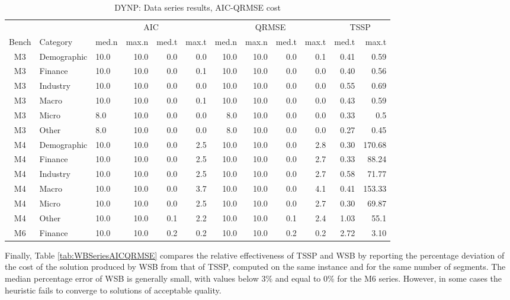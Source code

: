 \documentclass[preprints,article,submit,pdftex,moreauthors]{Definitions/mdpi}
\begin{document}
\begin{table}[ht]
	\centering
	\caption{DYNP: Data series results, AIC-QRMSE cost}\label{tab:DYNPseriesAICQRMSE}%
	\begin{tabular}{@{}cl|lr|rr|rr|rr|rr}
		\toprule
		& & \multicolumn{4}{c|}{AIC} & \multicolumn{4}{c}{QRMSE} & \multicolumn{2}{|c}{TSSP} \\
		Bench & Category & med.n & max.n & med.t & max.t & med.n & max.n & med.t & max.t & med.t & max.t \\
		\midrule
		M3 & Demographic  & 10.0 & 10.0 & 0.0 & 0.0 & 10.0 & 10.0 & 0.0 & 0.1 & 0.41 & 0.59\\
		M3 & Finance     & 10.0 & 10.0 & 0.0 & 0.1 & 10.0 & 10.0 & 0.0 & 0.0 & 0.40 & 0.56\\
		M3 & Industry     & 10.0 & 10.0 & 0.0 & 0.0 & 10.0 & 10.0 & 0.0 & 0.0 & 0.55 & 0.69\\
		M3 & Macro        & 10.0 & 10.0 & 0.0 & 0.1 & 10.0 & 10.0 & 0.0 & 0.0 & 0.43 & 0.59\\
		M3 & Micro        & 8.0 & 10.0 & 0.0 & 0.0 & 8.0 & 10.0 & 0.0 & 0.0 & 0.33 & 0.5\\
		M3 & Other        & 8.0 & 10.0 & 0.0 & 0.0 & 8.0 & 10.0 & 0.0 & 0.0  & 0.27 & 0.45\\
		M4 & Demographic & 10.0 & 10.0 & 0.0 & 2.5 & 10.0 & 10.0 & 0.0 & 2.8 & 0.30 & 170.68\\
		M4 & Finance & 10.0 & 10.0 & 0.0 & 2.5 & 10.0 & 10.0 & 0.0 & 2.7 & 0.33 & 88.24\\
		M4 & Industry & 10.0 & 10.0 & 0.0 & 2.5 & 10.0 & 10.0 & 0.0 & 2.7 & 0.58 & 71.77\\
		M4 & Macro & 10.0 & 10.0 & 0.0 & 3.7 & 10.0 & 10.0 & 0.0 & 4.1 & 0.41 & 153.33\\
		M4 & Micro & 10.0 & 10.0 & 0.0 & 2.5 & 10.0 & 10.0 & 0.0 & 2.7 & 0.30 & 69.87\\
		M4 & Other & 10.0 & 10.0 & 0.1 & 2.2 & 10.0 & 10.0 & 0.1 & 2.4 & 1.03 & 55.1\\
		M6 & Finance & 10.0 & 10.0 & 0.2 & 0.2 & 10.0 & 10.0 & 0.2 & 0.2& 2.72 & 3.10 \\
		\bottomrule
	\end{tabular}
\end{table}

Finally, Table \ref{tab:WBSeriesAICQRMSE} compares the relative effectiveness of TSSP and WSB by reporting the percentage deviation of the cost of the solution produced by WSB from that of TSSP, computed on the same instance and for the same number of segments. The median percentage error of WSB is generally small, with values below 3\% and equal to 0\% for the M6 series. However, in some cases the heuristic fails to converge to solutions of acceptable quality.
\end{document}
